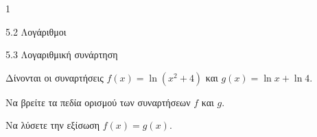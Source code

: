 \begin{ylh}{1}
\item 5.2 Λογάριθμοι
\item 5.3 Λογαριθμική συνάρτηση
\end{ylh}
Δίνονται οι συναρτήσεις $f(x) = \ln(x^2 + 4)$ και $g(x) = \ln x + \ln 4$.
\begin{alist}
\item Να βρείτε τα πεδία ορισμού των συναρτήσεων $f$ και $g$.
\item Να λύσετε την εξίσωση $f(x) = g(x)$.
\end{alist}

